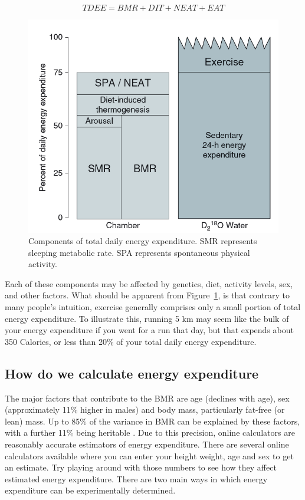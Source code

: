 \documentclass{tufte-handout}
\begin{document}
\begin{equation}
TDEE = BMR + DIT + NEAT + EAT
\end{equation}

\begin{figure}
\includegraphics{figures/tdee-components.png}
\caption{Components of total daily energy expenditure.  SMR represents sleeping metabolic rate. SPA represents spontaneous physical activity.}\label{fig:tdee-components}
\end{figure}

Each of these components may be affected by genetics, diet, activity levels, sex, and other factors.  What should be apparent from Figure~\ref{fig:tdee-components}, is that contrary to many people's intuition, exercise generally comprises only a small portion of total energy expenditure.  To illustrate this, running 5 km may seem like the bulk of your energy expenditure if you went for a run that day, but that expends about 350 Calories, or less than  20\% of your total daily energy expenditure.  

\subsection{How do we calculate energy expenditure}

The major factors that contribute to the BMR are age (declines with age), sex (approximately 11\% higher in males) and body mass, particularly fat-free (or lean) mass.  Up to 85\% of the variance in BMR can be explained by these factors, with a further 11\% being heritable \citep{Bogardus1986a}.  Due to this precision, online calculators are reasonably accurate estimators of energy expenditure.  There are several online calculators available where you can enter your height weight, age and sex to get an estimate.  Try playing around with those numbers to see how they affect estimated energy expenditure.  There are two main ways in which energy expenditure can be experimentally determined.
\end{document}
